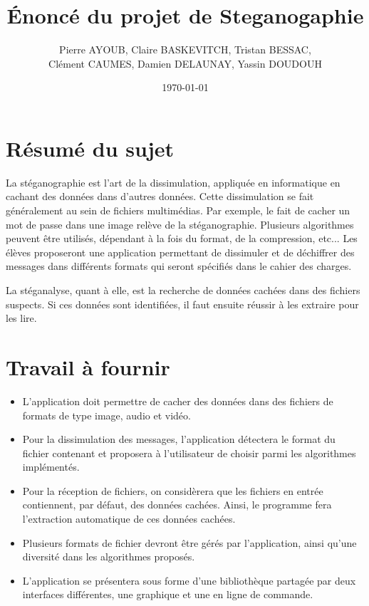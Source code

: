 \documentclass[11pt]{article}
\title{Énoncé du projet de Steganogaphie}
\author{Pierre AYOUB, Claire BASKEVITCH, Tristan BESSAC, \\
Clément CAUMES, Damien DELAUNAY, Yassin DOUDOUH}
\date\today
\begin{document}
\maketitle

\section{Résumé du sujet}

La stéganographie est l'art de la dissimulation, appliquée en informatique en
cachant des données dans d'autres données. Cette dissimulation se fait
généralement au sein de fichiers multimédias. Par exemple, le fait de cacher un
mot de passe dans une image relève de la stéganographie. Plusieurs algorithmes
peuvent être utilisés, dépendant à la fois du format, de la compression, etc...
Les élèves proposeront une application permettant de dissimuler et de déchiffrer
des messages dans différents formats qui seront spécifiés dans le cahier des
charges.

La stéganalyse, quant à elle, est la recherche de données cachées dans des
fichiers suspects. Si ces données sont identifiées, il faut ensuite réussir à les
extraire pour les lire.

\section{Travail à fournir}

\begin{itemize}
    \item L'application doit permettre de cacher des données dans des fichiers de formats de type image, audio et vidéo.
    \item Pour la dissimulation des messages, l'application détectera le format
        du fichier contenant et proposera à l'utilisateur de choisir parmi les
        algorithmes implémentés. 
    \item Pour la réception de fichiers, on considèrera que les fichiers en entrée contiennent, par défaut, des données cachées. 
    Ainsi, le programme fera l'extraction automatique de ces données cachées.
    \item Plusieurs formats de fichier devront être gérés par l'application,
        ainsi qu'une diversité dans les algorithmes proposés.
    \item L'application se présentera sous forme d'une bibliothèque partagée par
        deux interfaces différentes, une graphique et une en ligne de commande.
\end{itemize}
\end{document}
